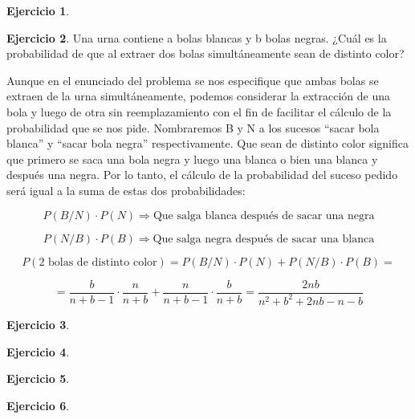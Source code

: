 \documentclass[a4paper, 12pt]{article}
\theoremstyle{definition}
\newtheorem{ej}{Ejercicio}
\begin{document}
\newpage

\begin{ej}
\end{ej}

\begin{ej}
Una urna contiene a bolas blancas y b bolas negras. ¿Cuál es la probabilidad de que al extraer
dos bolas simultáneamente sean de distinto color?

\medskip

Aunque en el enunciado del problema se nos especifique que ambas bolas se extraen de la urna simultáneamente, podemos considerar la extracción de una bola y luego de otra sin reemplazamiento con el fin  de facilitar el cálculo de la probabilidad que se nos pide. Nombraremos B y N a los sucesos ``sacar bola blanca'' y ``sacar bola negra'' respectivamente. Que sean de distinto color significa que primero se saca una bola negra y luego una blanca o bien una blanca y después una negra. Por lo tanto, el cálculo de la probabilidad del suceso pedido será igual a la suma de estas dos probabilidades:

\[
	P(B/N)\cdot P(N) \Rightarrow \text{Que salga blanca después de sacar una negra}
\]

\[
	P(N/B)\cdot P(B) \Rightarrow \text{Que salga negra después de sacar una blanca}
\]

\[
	P(\text{2 bolas de distinto color}) = P(B/N)\cdot P(N) + P(N/B)\cdot P(B) =
\]

\[
	= \frac{b}{n+b-1}\cdot\frac{n}{n+b} + \frac{n}{n+b-1}\cdot\frac{b}{n+b} = \frac{2nb}{n^2+b^2+2nb-n-b}
\]

\end{ej}

\begin{ej}
\end{ej}

\begin{ej}
\end{ej}

\begin{ej}
\end{ej}

\begin{ej}
\end{ej}
\end{document}
